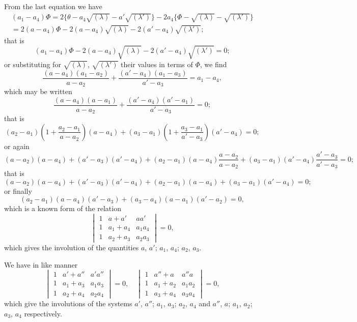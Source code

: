 \documentclass[11pt,a4paper]{article}
\theoremstyle{plain}
\begin{document}
From the last equation we have
\begin{multline}
(a_1-a_4)\Phi = 2\{\theta - a_4\sqrt{(\lambda)} - a'\sqrt{(\lambda')}\} - 2a_4\{\Phi - \sqrt{(\lambda)} - \sqrt{(\lambda')}\} \\
= 2(a-a_4)\Phi - 2(a-a_4)\sqrt{(\lambda)} - 2(a'-a_4)\sqrt{(\lambda')};
\end{multline}
that is
\begin{equation}
(a_1-a_4)\Phi - 2(a-a_4)\sqrt{(\lambda)} - 2(a'-a_4)\sqrt{(\lambda')} = 0;
\end{equation}
or substituting for $\sqrt{(\lambda)}$, $\sqrt{(\lambda')}$ their values in terms of $\Phi$, we find
\begin{equation}
\frac{(a-a_4)(a_1-a_2)}{a-a_2} + \frac{(a'-a_4)(a_1-a_3)}{a'-a_3} = a_1 - a_4,
\end{equation}
which may be written
\begin{equation}
\frac{(a-a_4)(a-a_1)}{a-a_2} + \frac{(a'-a_4)(a'-a_1)}{a'-a_3} = 0;
\end{equation}
that is
\begin{equation}
(a_2-a_1)\left(1 + \frac{a_2-a_1}{a-a_2}\right)(a-a_4) + (a_3-a_1)\left(1 + \frac{a_3-a_1}{a'-a_3}\right)(a'-a_4) = 0;
\end{equation}
or again
\begin{equation}
(a-a_2)(a-a_4) + (a'-a_3)(a'-a_4) + (a_2-a_1)(a-a_4)\frac{a-a_2}{a-a_2} + (a_3-a_1)(a'-a_4)\frac{a'-a_3}{a'-a_3} = 0;
\end{equation}
that is
\begin{equation}
(a-a_2)(a-a_4) + (a'-a_3)(a'-a_4) + (a_2-a_1)(a-a_4) + (a_3-a_1)(a'-a_4) = 0;
\end{equation}
or finally
\begin{equation}
(a_2-a_1)(a-a_4)(a'-a_3) + (a_3-a_4)(a-a_1)(a'-a_2) = 0,
\end{equation}
which is a known form of the relation
\begin{equation}
\begin{vmatrix}
1 & a+a' & aa' \\
1 & a_1+a_4 & a_1a_4 \\
1 & a_2+a_3 & a_2a_3
\end{vmatrix} = 0,
\end{equation}
which gives the involution of the quantities $a$, $a'$; $a_1$, $a_4$; $a_2$, $a_3$.

We have in like manner
\begin{equation}
\begin{vmatrix}
1 & a'+a'' & a'a'' \\
1 & a_1+a_3 & a_1a_3 \\
1 & a_2+a_4 & a_2a_4
\end{vmatrix} = 0, \quad
\begin{vmatrix}
1 & a''+a & a''a \\
1 & a_1+a_2 & a_1a_2 \\
1 & a_3+a_4 & a_3a_4
\end{vmatrix} = 0,
\end{equation}
which give the involutions of the systems $a'$, $a''$; $a_1$, $a_3$; $a_2$, $a_4$ and $a''$, $a$; $a_1$, $a_2$; $a_3$, $a_4$ respectively.
\end{document}
